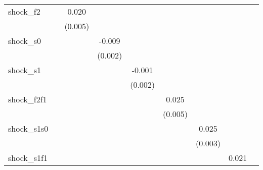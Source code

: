 {\begin{tabular}{l*{8}{c}}
\addlinespace
shock\_f2    &                     &       0.020\sym{***}&                     &                     &                     &                     &                     &                     \\
            &                     &     (0.005)         &                     &                     &                     &                     &                     &                     \\
\addlinespace
shock\_s0    &                     &                     &      -0.009\sym{***}&                     &                     &                     &                     &                     \\
            &                     &                     &     (0.002)         &                     &                     &                     &                     &                     \\
\addlinespace
shock\_s1    &                     &                     &                     &      -0.001         &                     &                     &                     &                     \\
            &                     &                     &                     &     (0.002)         &                     &                     &                     &                     \\
\addlinespace
shock\_f2f1  &                     &                     &                     &                     &       0.025\sym{***}&                     &                     &                     \\
            &                     &                     &                     &                     &     (0.005)         &                     &                     &                     \\
\addlinespace
shock\_s1s0  &                     &                     &                     &                     &                     &       0.025\sym{***}&                     &                     \\
            &                     &                     &                     &                     &                     &     (0.003)         &                     &                     \\
\addlinespace
shock\_s1f1  &                     &                     &                     &                     &                     &                     &       0.021\sym{***}&                     \\

\end{tabular}}
